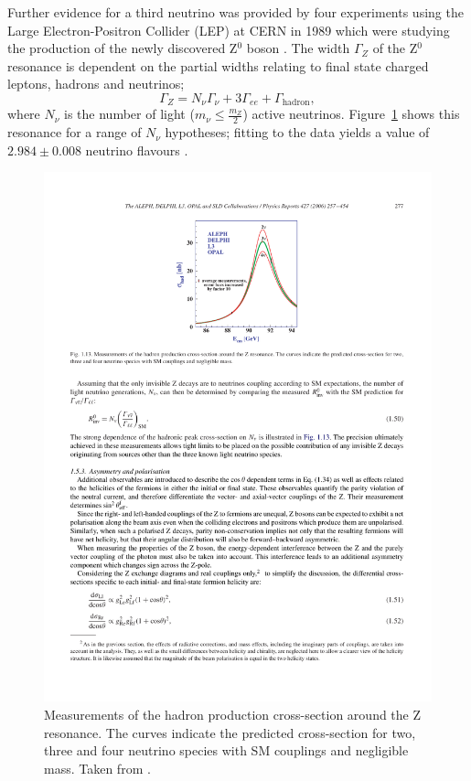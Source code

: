 Further evidence for a third neutrino was provided by four experiments using the Large Electron-Positron Collider (LEP) at CERN in 1989 which were studying the production of the newly discovered Z$^0$ boson \cite{DeCamp1989,Adeva1989,Akrawy1989,Aarnio1989}.  The width $\Gamma_Z$ of the Z$^0$ resonance is dependent on the partial widths relating to final state charged leptons, hadrons and neutrinos;
\begin{equation}
  \Gamma_Z = N_{\nu} \Gamma_{\nu} + 3 \Gamma_{ee} + \Gamma_{\mathrm{hadron}},
\end{equation}
where $N_{\nu}$ is the number of light ($m_{\nu} \le \frac{m_Z}{2}$) active neutrinos.  Figure~\ref{fig:LEPZ0Resonance} shows this resonance for a range of $N_{\nu}$ hypotheses; fitting to the data yields a value of $2.984 \pm 0.008$ neutrino flavours \cite{Schael2006}.

\begin{figure}
  \centering
  \includegraphics[width=12cm]{LEPZ0Resonance.pdf}
  \caption[Measurements of the hadron production cross-section around the Z resonance.]{Measurements of the hadron production cross-section around the Z resonance.  The curves indicate the predicted cross-section for two, three and four neutrino species with SM couplings and negligible mass.  Taken from \cite{Schael2006}.}
  \label{fig:LEPZ0Resonance}
\end{figure}

